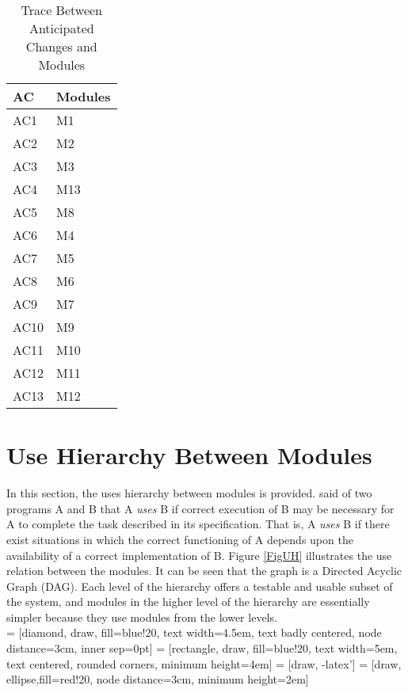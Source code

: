 \documentclass[12pt, titlepage]{article}
\begin{document}
\begin{table}[H]
\centering
\begin{tabular}{p{} p{}}
\toprule
\textbf{AC} & \textbf{Modules}\\
\midrule
AC1 & M1\\
AC2 & M2\\
AC3 & M3\\
AC4 & M13\\
AC5 & M8\\ 
AC6 & M4\\ 
AC7 & M5\\ 
AC8 & M6\\ 
AC9 & M7\\ 
AC10 & M9\\ 
AC11 & M10\\
AC12 & M11\\ 
AC13 & M12\\
\bottomrule
\end{tabular}
\caption{Trace Between Anticipated Changes and Modules}
\label{TblACT}
\end{table}

\section{Use Hierarchy Between Modules} \label{SecUse}

In this section, the uses hierarchy between modules is
provided. \citet{Parnas1978} said of two programs A and B that A {\em uses} B if
correct execution of B may be necessary for A to complete the task described in
its specification. That is, A {\em uses} B if there exist situations in which
the correct functioning of A depends upon the availability of a correct
implementation of B.  Figure \ref{FigUH} illustrates the use relation between
the modules. It can be seen that the graph is a Directed Acyclic Graph
(DAG). Each level of the hierarchy offers a testable and usable subset of the
system, and modules in the higher level of the hierarchy are essentially simpler
because they use modules from the lower levels. \\



 = [diamond, draw, fill=blue!20, 
text width=4.5em, text badly centered, node distance=3cm, inner sep=0pt]
 = [rectangle, draw, fill=blue!20, 
text width=5em, text centered, rounded corners, minimum height=4em]
 = [draw, -latex']
 = [draw, ellipse,fill=red!20, node distance=3cm,
minimum height=2em] 
\end{document}
